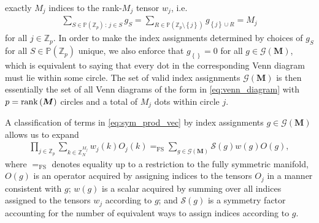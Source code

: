 \documentclass[nofootinbib,notitlepage,11pt]{revtex4-2}
\newcommand{\p}[1]{\left(#1\right)} %
\renewcommand{\set}[1]{\left\{#1\right\}} %
\newcommand{\m}{\bm} %
\newcommand{\1}{\mathds{1}}
\newcommand{\G}{\mathcal{G}}
\renewcommand{\S}{\mathcal{S}}
\newcommand{\PP}{\mathbb{P}}
\newcommand{\ZZ}{\mathbb{Z}}
\newcommand{\EQFS}{=_{\text{FS}}}
\begin{document}
exactly $M_j$ indices to the rank-$M_j$ tensor $w_j$, i.e.~
\begin{align}
  \sum_{S\in\PP\p{\ZZ_p}\,:\,j\in S} g_S
  = \sum_{R\in\PP\p{\ZZ_p\setminus\set{j}}} g_{\set{j}\cup R}
  = M_j
\end{align}
for all $j\in\ZZ_p$.  In order to make the index assignments
determined by choices of $g_S$ for all $S\in\PP\p{\ZZ_p}$ unique, we
also enforce that $g_{\set{}}=0$ for all $g\in\G\p{\m M}$, which is
equivalent to saying that every dot in the corresponding Venn diagram
must lie within some circle.  The set of valid index assignments
$\G\p{\m M}$ is then essentially the set of all Venn diagrams of the
form in \eqref{eq:venn_diagram} with $p=\rank\p{\m M}$ circles and a
total of $M_j$ dots within circle $j$.

A classification of terms in \eqref{eq:sym_prod_vec} by index
assignments $g\in\G\p{\m M}$ allows us to expand
\begin{align}
  \prod_{j\in\ZZ_p} \sum_{k\in\ZZ_N^{M_j}} w_j\p{k} O_j\p{k}
  \EQFS \sum_{g\in\G\p{\m M}} \S\p{g} w\p{g} O\p{g},
  \label{eq:sym_prod_group_start}
\end{align}
where $\EQFS$ denotes equality up to a restriction to the fully
symmetric manifold, $O\p{g}$ is an operator acquired by assigning
indices to the tensors $O_j$ in a manner consistent with $g$; $w\p{g}$
is a scalar acquired by summing over all indices assigned to the
tensors $w_j$ according to $g$; and $\S\p{g}$ is a symmetry factor
accounting for the number of equivalent ways to assign indices
according to $g$.
\end{document}
